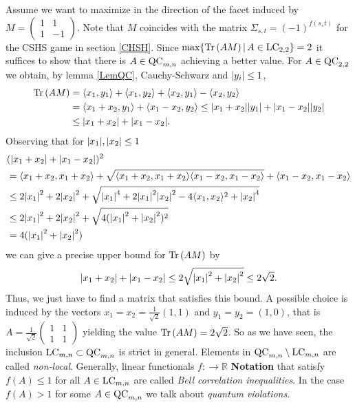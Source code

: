 Assume we want to maximize in the direction of the facet induced by $M = \begin{pmatrix}
1 & 1 \\ 1 & -1 
\end{pmatrix} $. Note that $ M $ coincides with the matrix $ \Sigma_{s,t} = (-1)^{f(s,t)} $ for the CSHS game in section \ref{CHSH}. Since $ \max \{  \text{Tr} \, {(AM)} \, | \, A \in \textup{LC}_{2,2} \} = 2 $ it suffices to show that there is $ A \in \textup{QC}_{m,n} $ achieving a better value. For $ A \in \textup{QC}_{2,2} $ we obtain, by lemma \ref{LemQC}, Cauchy-Schwarz and $ {\left|{y_i}\right|}\le 1 $,
\begin{align*}
	\text{Tr} \, {(AM)} &= \langle x_1,y_1 \rangle + \langle x_1,y_2 \rangle + \langle x_2,y_1 \rangle - \langle x_2,y_2 \rangle   \\
	&= \langle x_1+x_2,y_1 \rangle + \langle x_1-x_2,y_2 \rangle  \le {\left|{x_1+x_2}\right|}{\left|{y_1}\right|} + {\left|{x_1-x_2}\right|}{\left|{y_2}\right|}  \\
	&\le {\left|{x_1+x_2}\right|} + {\left|{x_1-x_2}\right|}.
\end{align*} 
Observing that for $ {\left|{x_1}\right|},{\left|{x_2}\right|}\le  1 $
\begin{align*}
	&({\left|{x_1+x_2}\right|} + {\left|{x_1-x_2}\right|})^2 \\
	&= \langle x_1+x_2,x_1+x_2\rangle  +\sqrt{\langle x_1+x_2,x_1+x_2\rangle  \langle x_1-x_2,x_1-x_2\rangle} +  \langle x_1-x_2,x_1-x_2\rangle  \\
	&\le 2{\left|{x_1}\right|}^2+2{\left|{x_2}\right|}^2 + \sqrt{{\left|{x_1}\right|}^4+2{\left|{x_1}\right|}^2{\left|{x_2}\right|}^2-4\langle x_1,x_2\rangle^2+{\left|{x_2}\right|}^4}  \\
	&\le  2{\left|{x_1}\right|}^2+2{\left|{x_2}\right|}^2 + \sqrt{4({\left|{x_1}\right|}^2+{\left|{x_2}\right|}^2)^2}  \\
	&= 4({\left|{x_1}\right|}^2+{\left|{x_2}\right|}^2)
\end{align*}
we can give a precise upper bound for $ \text{Tr} \, {(AM)}  $ by 
\begin{align*}
	{\left|{x_1+x_2}\right|} + {\left|{x_1-x_2}\right|} \le 2\sqrt{{\left|{x_1}\right|}^2+{\left|{x_2}\right|}^2} \le 2 \sqrt{2}.
\end{align*}
Thus, we just have to find a matrix that satisfies this bound. A possible choice is induced by the vectors $ x_1 = x_2 = \frac{1}{\sqrt{2}}(1,1) $ and $ y_1 = y_2 =(1,0) $, that is $ A = \frac{1}{\sqrt{2}}\begin{pmatrix}
1 & 1 \\ 1 & 1 
\end{pmatrix} $ yielding the value $ \text{Tr} \, {(AM)}  = 2 \sqrt{2} $.
So as we have seen, the inclusion $ \textup{LC}_{m,n} \subset \textup{QC}_{m,n} $ is strict in general. Elements in $ \textup{QC}_{m,n} \setminus \textup{LC}_{m,n} $ are called {\itshape non-local}.
Generally, linear functionals $ f: \to \mathbb{R} $ \textbf{Notation} that satisfy $ f(A) \le 1 $ for all $ A \in \textup{LC}_{m,n} $ are called {\itshape Bell correlation inequalities}. In the case $ f(A) > 1 $ for some $ A \in \textup{QC}_{m,n} $ we talk about {\itshape quantum violations}. 